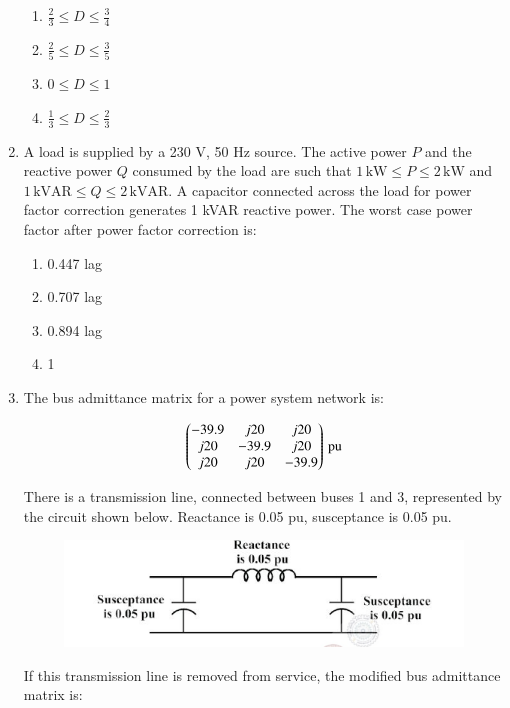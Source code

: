 \documentclass[journal,12pt,onecolumn]{IEEEtran}
\theoremstyle{remark}
\begin{document}
\begin{enumerate}
\begin{multicols}{2}
\begin{enumerate}
\item $\tfrac{2}{3} \leq D \leq \tfrac{3}{4}$
\item $\tfrac{2}{5} \leq D \leq \tfrac{3}{5}$
\item $0 \leq D \leq 1$
\item $\tfrac{1}{3} \leq D \leq \tfrac{2}{3}$
\end{enumerate}
\end{multicols}

\item A load is supplied by a 230 V, 50 Hz source. The active power $P$ and the reactive power $Q$ consumed by the load are such that $1 \,\text{kW} \leq P \leq 2 \,\text{kW}$ and $1 \,\text{kVAR} \leq Q \leq 2 \,\text{kVAR}$. A capacitor connected across the load for power factor correction generates 1 kVAR reactive power. The worst case power factor after power factor correction is:  

\begin{multicols}{2}
\begin{enumerate}
\item 0.447 lag
\item 0.707 lag
\item 0.894 lag
\item 1
\end{enumerate}
\end{multicols}

\item The bus admittance matrix for a power system network is:  

\[
\begin{pmatrix}
-39.9 & j20 & j20 \\
j20 & -39.9 & j20 \\
j20 & j20 & -39.9
\end{pmatrix} \, \text{pu}
\]

There is a transmission line, connected between buses 1 and 3, represented by the circuit shown below.  
Reactance is 0.05 pu, susceptance is 0.05 pu.  
\begin{figure}[H]
    \centering
    \includegraphics[width=0.5\columnwidth]{figs/40.png}
    \caption{}
    \label{fig:placeholder}
\end{figure}

If this transmission line is removed from service, the modified bus admittance matrix is:  


\end{enumerate}
\end{document}
